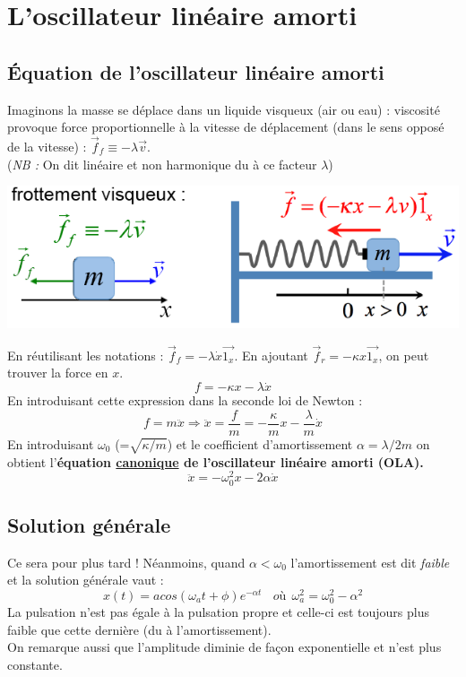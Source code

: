 \documentclass	[11pt, a4paper, openany]{book}
\begin{document}
\section{L'oscillateur linéaire amorti}
\subsection{Équation de l'oscillateur linéaire amorti}
Imaginons la masse se déplace dans un liquide visqueux (air ou eau) : viscosité provoque force proportionnelle à la vitesse de déplacement (dans le sens opposé de la vitesse) : $\vec{f}_f \equiv -\lambda\vec{v}$.\\
(\textit{NB :} On dit linéaire et non harmonique du à ce facteur $\lambda$)
\begin{center}
\includegraphics[scale=0.45]{oo/image7.png}
\end{center}
En réutilisant les notations : $\vec{f}_f = -\lambda\dot{x}\vec{1_x}$. En ajoutant $\vec{f}_r = -\kappa x \vec{1_x}$, on peut trouver la force en $x$.
\begin{equation}
f = -\kappa x - \lambda \dot{x}
\end{equation}
En introduisant cette expression dans la seconde loi de Newton : 
\begin{equation}
f = m\ddot{x} \Rightarrow \ddot{x} = \frac{f}{m} = -\frac{\kappa}{m}x - \frac{\lambda}{m}\dot{x}
\end{equation}
En introduisant $\omega_0$ (=$\sqrt{\kappa/m}$) et le coefficient d'amortissement $\alpha = \lambda/2m$ on obtient l'\textbf{équation \underline{canonique} de l'oscillateur linéaire amorti (OLA).}
\begin{equation}
\ddot{x} = - \omega_0^2x - 2\alpha\dot{x}
\end{equation}

\subsection{Solution générale}
Ce sera pour plus tard ! Néanmoins, quand $\alpha < \omega_0$ l'amortissement est dit \textit{faible} et la solution générale vaut : 
\begin{equation}
x(t) = a cos(\omega_a t + \phi) e^{-\alpha t}\ \ \ \ où\ \ \omega_a^2 = \omega_0^2 - \alpha^2
\end{equation}
La pulsation n'est pas égale à la pulsation propre et celle-ci est toujours plus faible que cette dernière (du à l'amortissement).\\
On remarque aussi que l'amplitude diminie de façon exponentielle et n'est plus constante.
\end{document}
